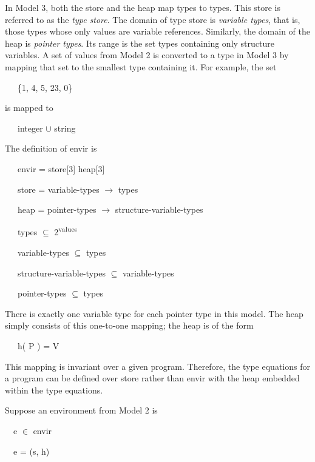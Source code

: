 In Model 3, both the store and the heap map types to types. This store
is referred to as the \textit{type store}. The domain of type store is
\textit{variable types}, that is, those types whose only values are
variable references.  Similarly, the domain of the heap is
\textit{pointer types}. Its range is the set types containing only
structure variables. A set of values from Model 2 is converted to a
type in Model 3 by mapping that set to the smallest type containing
it. For example, the set

{\ttfamily\mdseries
\ \ \ \{1, 4, 5, {\textquotedbl}23{\textquotedbl}, {\textquotedbl}0{\textquotedbl}\}}

\noindent is mapped to

{\ttfamily\mdseries
\ \ \ integer ${\cup}$ string}


The definition of envir\TextSubscript{[3]} is 

{\ttfamily\mdseries
\ \ \ envir\TextSubscript{[3]} = store[3] {\texttimes} heap[3]}

{\ttfamily\mdseries
\ \ \ store\TextSubscript{[3]} = variable-types $\rightarrow $ types}

{\ttfamily\mdseries
\ \ \ heap\TextSubscript{[3]} = pointer-types $\rightarrow $ structure-variable-types}

{\ttfamily\mdseries
\ \ \ types ${\subseteq}$ 2\textsuperscript{values}}

{\ttfamily\mdseries
\ \ \ variable-types ${\subseteq}$ types}

{\ttfamily\mdseries
\ \ \ structure-variable-types ${\subseteq}$ variable-types}

{\ttfamily\mdseries
\ \ \ pointer-types ${\subseteq}$ types}

There is exactly one variable type for each pointer type in this
model. The heap simply consists of this one-to-one mapping; the heap
is of the form

{\ttfamily\mdseries
\ \ \ h( P ) = V}

This mapping is invariant over a given program. Therefore, the type
equations for a program can be defined over store\TextSubscript{[3]}
rather than envir\TextSubscript{[3]} with the heap embedded within the
type equations.

Suppose an environment from Model 2 is 

{\ttfamily\mdseries
\ \ e \textrm{${\in}$ }envir\TextSubscript{[2]}}

{\ttfamily\mdseries
\ \ e = (s, h)}


